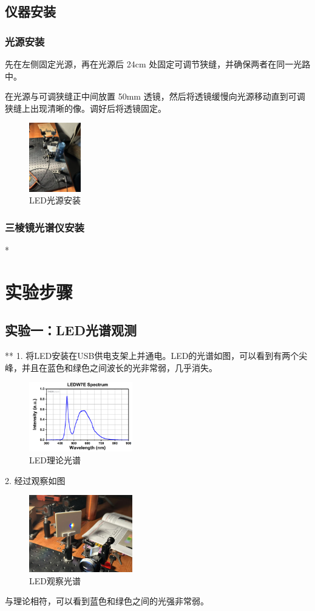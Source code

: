 \documentclass{ctexart}
\begin{document}
\subsection{仪器安装}
\subsubsection{光源安装}
先在左侧固定光源，再在光源后 24cm 处固定可调节狭缝，并确保两者在同一光路中。

在光源与可调狭缝正中间放置 50mm 透镜，然后将透镜缓慢向光源移动直到可调狭缝上出现清晰的像。调好后将透镜固定。
\begin{figure}[htbp]
    \centering
    \includegraphics[width=0.2\textwidth,height=0.3\textwidth]{pictures/微信图片_20241121154954.jpg}
    \caption{LED光源安装}
\end{figure}
\subsubsection{三棱镜光谱仪安装}
*
\section{实验步骤}

\subsection{实验一：LED光谱观测}
**
1. 将LED安装在USB供电支架上并通电。LED的光谱如图，可以看到有两个尖峰，并且在蓝色和绿色之间波长的光非常弱，几乎消失。
\begin{figure}[H]
    \centering
    \includegraphics[width=0.4\textwidth,height=0.2\textwidth]{pictures/光谱图.png}
    \caption{LED理论光谱}
\end{figure}

2. 经过观察如图
\begin{figure}[H]
    \centering
    \includegraphics[width=0.4\textwidth,height=0.2\textwidth]{pictures/微信图片_20241121154923.jpg}
    \caption{LED观察光谱}
\end{figure}
与理论相符，可以看到蓝色和绿色之间的光强非常弱。
\end{document}
